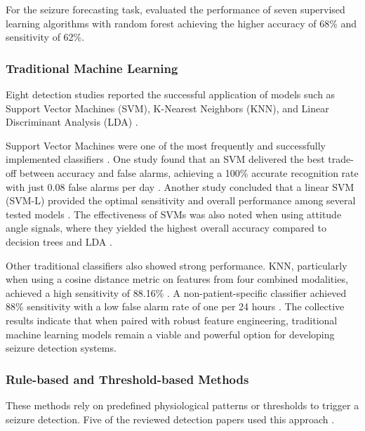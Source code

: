 For the seizure forecasting task, \cite{Vieluf2023-zv} evaluated the performance of seven supervised learning algorithms with random forest achieving the higher accuracy of 68\% and sensitivity of 62\%.


\subsubsection{Traditional Machine Learning}
Eight detection studies reported the successful application of models such as Support Vector Machines (SVM), K-Nearest Neighbors (KNN), and Linear Discriminant Analysis (LDA) \cite{Milosevic2016-ee, Hamlin2021-sd, Poh2012-af, Ge2023-ab, Li2022-ty, Xu2022-tx, Wang2025-my, De_Cooman2018-pq}.

Support Vector Machines were one of the most frequently and successfully implemented classifiers \cite{Milosevic2016-ee, De_Cooman2018-pq, Poh2012-af, Ge2023-ab, Li2022-ty, Xu2022-tx, Wang2025-my}. One study found that an SVM delivered the best trade-off between accuracy and false alarms, achieving a 100\% accurate recognition rate with just 0.08 false alarms per day \cite{Xu2022-tx}. Another study concluded that a linear SVM (SVM-L) provided the optimal sensitivity and overall performance among several tested models \cite{Wang2025-my}. The effectiveness of SVMs was also noted when using attitude angle signals, where they yielded the highest overall accuracy compared to decision trees and LDA \cite{Wang2025-ql}.

Other traditional classifiers also showed strong performance. KNN, particularly when using a cosine distance metric on features from four combined modalities, achieved a high sensitivity of 88.16\% \cite{Ge2023-ab}. A non-patient-specific classifier achieved 88\% sensitivity with a low false alarm rate of one per 24 hours \cite{Poh2012-af}. The collective results indicate that when paired with robust feature engineering, traditional machine learning models remain a viable and powerful option for developing seizure detection systems.


\subsubsection{Rule-based and Threshold-based Methods}
These methods rely on predefined physiological patterns or thresholds to trigger a seizure detection. Five of the reviewed detection papers used this approach \cite{Cogan2017-lg, Ali2020-ke, Hegarty-Craver2021-hk, Gheryani2017-yg, Arends2018-ew}.

